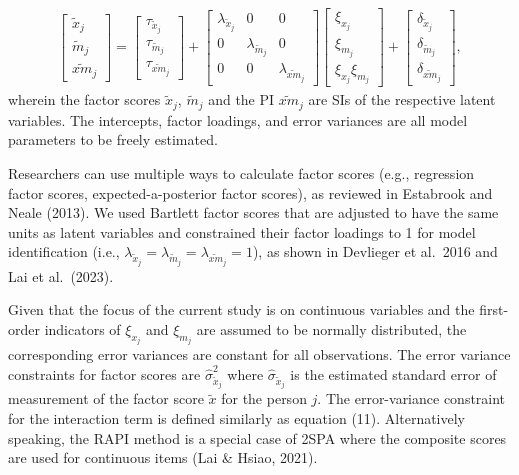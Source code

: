 \documentclass[
  man]{apa6}
\begin{document}
\begin{align}
    \begin{bmatrix}
        \tilde{x}_{j} \\ 
        \tilde{m}_{j} \\
        \widetilde{xm}_{j} 
    \end{bmatrix} = 
    \begin{bmatrix}
        \tau_{\tilde{x}_{j}} \\
        \tau_{\tilde{m}_{j}} \\ 
        \tau_{\widetilde{xm}_{j}}
    \end{bmatrix} + 
    \begin{bmatrix}
        \lambda_{\tilde{x}_{j}} & 0 & 0 \\
        0 & \lambda_{\tilde{m}_{j}} & 0 \\ 
        0 & 0 & \lambda_{\widetilde{xm}_{j}} 
    \end{bmatrix} 
    \begin{bmatrix}
        \xi_{x_{j}} \\  
        \xi_{m_{j}} \\
        \xi_{x_{j}}\xi_{m_{j}}
    \end{bmatrix} +
    \begin{bmatrix}
        \delta_{\tilde{x}_{j}} \\
        \delta_{\tilde{m}_{j}} \\ 
        \delta_{\widetilde{xm}_{j}}
    \end{bmatrix},
\end{align}
wherein the factor scores \(\tilde{x}_{j}\), \(\tilde{m}_{j}\) and the PI \(\widetilde{xm}_{j}\) are SIs of the respective latent variables. The intercepts, factor loadings, and error variances are all model parameters to be freely estimated.

Researchers can use multiple ways to calculate factor scores (e.g., regression factor scores, expected-a-posterior factor scores), as reviewed in Estabrook and Neale (2013). We used Bartlett factor scores that are adjusted to have the same units as latent variables and constrained their factor loadings to 1 for model identification (i.e., \(\lambda_{\tilde{x}_{j}} = \lambda_{\tilde{m}_{j}} = \lambda_{\widetilde{xm}_{j}} = 1\)), as shown in Devlieger et al.~2016 and Lai et al.~(2023).

Given that the focus of the current study is on continuous variables and the first-order indicators of \(\xi_{x_{j}}\) and \(\xi_{m_{j}}\) are assumed to be normally distributed, the corresponding error variances are constant for all observations. The error variance constraints for factor scores are \(\hat{\sigma}_{\tilde{x}_{j}}^2\) where \(\hat{\sigma}_{\tilde{x}_{j}}\) is the estimated standard error of measurement of the factor score \(\tilde{x}\) for the person \(j\). The error-variance constraint for the interaction term is defined similarly as equation (11). Alternatively speaking, the RAPI method is a special case of 2SPA where the composite scores are used for continuous items (Lai \& Hsiao, 2021).
\end{document}
